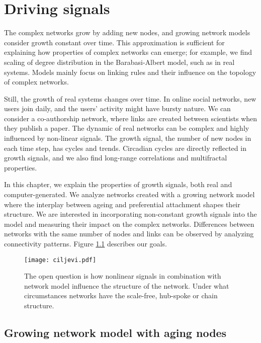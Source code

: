 
\chapter{Driving signals} %
\label{Ch:signals} %

The complex networks grow by adding new nodes, and growing network models consider growth constant over time. This approximation is sufficient for explaining how properties of complex networks can emerge; for example, we find scaling of degree distribution in the Barabasi-Albert model, such as in real systems. Models mainly focus on linking rules and their influence on the topology of complex networks. 

Still, the growth of real systems changes over time. In online social networks, new users join daily, and the users' activity might have bursty nature. We can consider a co-authorship network, where links are created between scientists when they publish a paper. The dynamic of real networks can be complex and highly influenced by non-linear signals. The growth signal, the number of new nodes in each time step, has cycles and trends. Circadian cycles are directly reflected in growth signals, and we also find long-range correlations and multifractal properties. 

In this chapter, we explain the properties of growth signals, both real and computer-generated. We analyze networks created with a growing network model where the interplay between ageing and preferential attachment shapes their structure. We are interested in incorporating non-constant growth signals into the model and measuring their impact on the complex networks. Differences between networks with the same number of nodes and links can be observed by analyzing connectivity patterns. Figure \ref{fig:ciljevi} describes our goals. 

\begin{figure}[!ht]
	\centering
	\texttt{[image: ciljevi.pdf]}
	\caption{The open question is how nonlinear signals in combination with network model influence the structure of the network. Under what circumstances networks have the scale-free, hub-spoke or chain structure. }
	\label{fig:ciljevi}
\end{figure}

\section{Growing network model with aging nodes}

